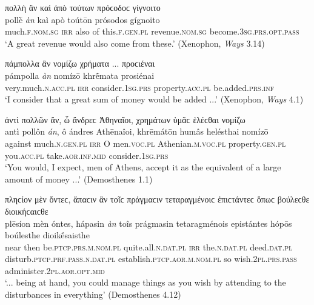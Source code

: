 \begin{exe}
\ex πολλὴ ἂν καὶ ἀπὸ τούτων πρόϲοδοϲ γίγνοιτο\\
\gll pollḕ \emph{àn} kaì apò toútōn prósodos gígnoito\\
much.\textsc{f.nom.sg} \textsc{irr} also of this.\textsc{f.gen.pl} revenue.\textsc{nom.sg} become.\textsc{3sg.prs.opt.pass}\\
\trans `A great revenue would also come from these.' (Xenophon, \textit{Ways} 3.14)
\label{wordgroup29}
\end{exe}

\begin{exe}
\ex πάμπολλα ἂν νομίζω χρήματα ... προϲιέναι\\
\gll pámpolla \emph{àn} nomízō khrḗmata prosiénai\\
very.much.\textsc{n.acc.pl} \textsc{irr} consider.\textsc{1sg.prs} property.\textsc{acc.pl} be.added.\textsc{prs.inf}\\
\trans `I consider that a great sum of money would be added ...' (Xenophon, \textit{Ways} 4.1)
\label{wordgroup30}
\end{exe}

\begin{exe}
\ex ἀντὶ πολλῶν ἄν, ὦ ἄνδρεϲ Ἀθηναῖοι, χρημάτων ὑμᾶϲ ἑλέϲθαι νομίζω\\
\gll antì pollôn \emph{án}, ô ándres Athēnaîoi, khrēmátōn humâs helésthai nomízō\\
against much.\textsc{n.gen.pl} \textsc{irr} O men.\textsc{voc.pl} Athenian.\textsc{m.voc.pl} property.\textsc{gen.pl} you.\textsc{acc.pl} take.\textsc{aor.inf.mid} consider.\textsc{1sg.prs}\\
\trans `You would, I expect, men of Athens, accept it as the equivalent of a large amount of money ...' (Demosthenes 1.1)
\label{wordgroup31}
\end{exe}

\begin{exe}
\ex πληϲίον μὲν ὄντεϲ, ἅπαϲιν ἂν τοῖϲ πράγμαϲιν τεταραγμένοιϲ ἐπιϲτάντεϲ ὅπωϲ βούλεϲθε διοικήϲαιϲθε\\
\gll plēsíon mèn óntes, hápasin \emph{àn} toîs prágmasin tetaragménois epistántes hópōs boúlesthe dioikḗsaisthe\\
near then be.\textsc{ptcp.prs.m.nom.pl} quite.all.\textsc{n.dat.pl} \textsc{irr} the.\textsc{n.dat.pl} deed.\textsc{dat.pl} disturb.\textsc{ptcp.prf.pass.n.dat.pl} establish.\textsc{ptcp.aor.m.nom.pl} so wish.\textsc{2pl.prs.pass} administer.\textsc{2pl.aor.opt.mid}\\
\trans `... being at hand, you could manage things as you wish by attending to the disturbances in everything' (Demosthenes 4.12)
\label{wordgroup32}
\end{exe}

